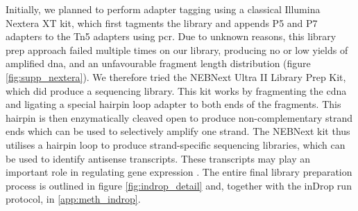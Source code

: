 Initially, we planned to perform adapter tagging using a classical Illumina Nextera XT kit, which first tagments the library and appends P5 and P7 adapters to the Tn5 adapters using \acrshort{pcr}. Due to unknown reasons, this library prep approach failed multiple times on our library, producing no or low yields of amplified \acrshort{dna}, and an unfavourable fragment length distribution (figure \ref{fig:supp_nextera}). We therefore tried the NEBNext Ultra II Library Prep Kit, which did produce a sequencing library. This kit works by fragmenting the \acrshort{cdna} and ligating a special hairpin loop adapter to both ends of the fragments. This hairpin is then enzymatically cleaved open to produce non-complementary strand ends which can be used to selectively amplify one strand. The NEBNext kit thus utilises a hairpin loop to produce strand-specific sequencing libraries, which can be used to identify antisense transcripts. These transcripts may play an important role in regulating gene expression \citep{mills2013}. The entire final library preparation process is outlined in figure \ref{fig:indrop_detail} and, together with the inDrop run protocol, in \ref{app:meth_indrop}.\pms

